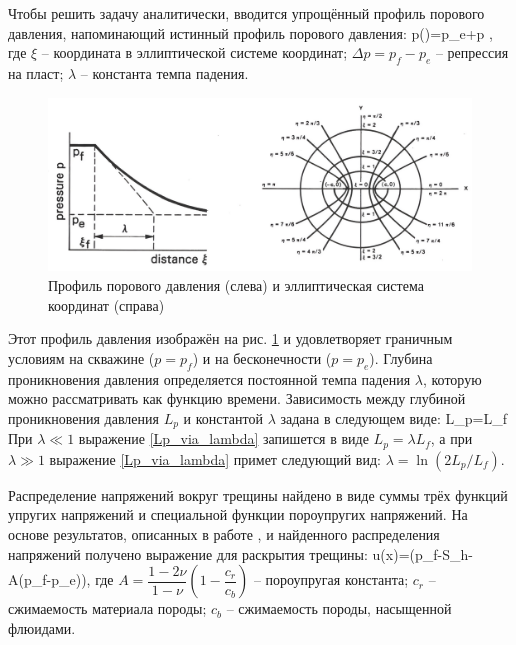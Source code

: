 Чтобы решить задачу аналитически, вводится упрощённый профиль порового давления, напоминающий истинный профиль порового давления:
\beq
p(\xi)=p_e+\Delta p ,
\eeq
где $\xi$ -- координата в эллиптической системе координат;
$\Delta p=p_f-p_e$ -- репрессия на пласт;
$\lambda$ -- константа темпа падения.

\begin{figure}[H] 
\center
\includegraphics[width=\linewidth]{images/Hagoort_pressure_distribution.jpg}
\caption{Профиль порового давления (слева) и эллиптическая система координат (справа) \cite{hagoort_phd}} 
\label{fig:hagoort_pressure_distribution}  
\end{figure}

Этот профиль давления изображён на рис. \ref{fig:hagoort_pressure_distribution} и удовлетворяет граничным условиям на скважине ($p=p_f$) и на бесконечности ($p=p_e$).
Глубина проникновения давления определяется постоянной темпа падения $\lambda$, которую можно рассматривать как функцию времени.
Зависимость между глубиной проникновения давления $L_p$ и константой $\lambda$ задана в следующем виде:
\beq\label{Lp_via_lambda}
L_p=L_{\!f}\sinh{\lambda}
\eeq
При $\lambda\ll 1$ выражение \eqref{Lp_via_lambda} запишется в виде $L_p=\lambda L_f$, а при $\lambda\gg 1$ выражение \eqref{Lp_via_lambda} примет следующий вид: $\lambda=\ln{\left(2L_p/L_{\!f}\right)}$.

Распределение напряжений вокруг трещины найдено в виде суммы трёх функций упругих напряжений и специальной функции пороупругих напряжений.
На основе результатов, описанных в работе \cite{timoshenko_goodier}, и найденного распределения напряжений получено выражение для раскрытия трещины:
\beq\label{HaggoortFractureOpening}
u(x)=\left(p_{\!f}-S_h-A\left(p_{\!f}-p_e\right)\right),
\eeq
где
$A=\dfrac{1-2\nu}{1-\nu}\left(1-\dfrac{c_r}{c_b}\right)$ -- пороупругая константа;
$c_r$ -- сжимаемость материала породы;
$c_b$ -- сжимаемость породы, насыщенной флюидами.

